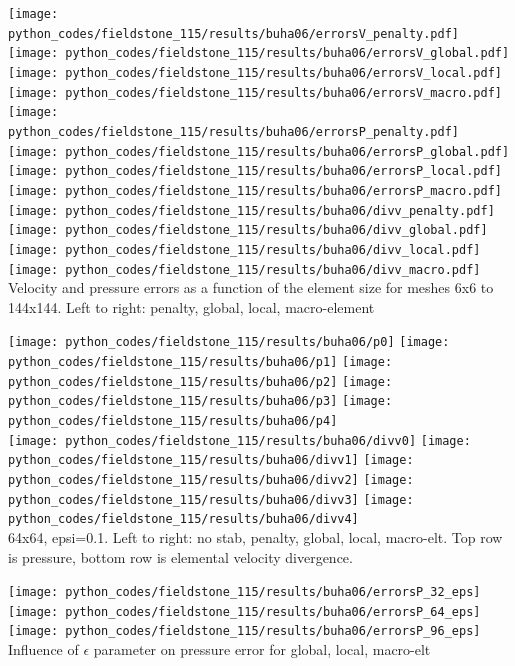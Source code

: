 \begin{center}
\texttt{[image: python\_codes/fieldstone\_115/results/buha06/errorsV\_penalty.pdf]}
\texttt{[image: python\_codes/fieldstone\_115/results/buha06/errorsV\_global.pdf]}
\texttt{[image: python\_codes/fieldstone\_115/results/buha06/errorsV\_local.pdf]}
\texttt{[image: python\_codes/fieldstone\_115/results/buha06/errorsV\_macro.pdf]}\\
\texttt{[image: python\_codes/fieldstone\_115/results/buha06/errorsP\_penalty.pdf]}
\texttt{[image: python\_codes/fieldstone\_115/results/buha06/errorsP\_global.pdf]}
\texttt{[image: python\_codes/fieldstone\_115/results/buha06/errorsP\_local.pdf]}
\texttt{[image: python\_codes/fieldstone\_115/results/buha06/errorsP\_macro.pdf]}\\
\texttt{[image: python\_codes/fieldstone\_115/results/buha06/divv\_penalty.pdf]}
\texttt{[image: python\_codes/fieldstone\_115/results/buha06/divv\_global.pdf]}
\texttt{[image: python\_codes/fieldstone\_115/results/buha06/divv\_local.pdf]}
\texttt{[image: python\_codes/fieldstone\_115/results/buha06/divv\_macro.pdf]}\\
{\captionfont Velocity and pressure errors as a function of the element size for meshes 6x6 to 144x144.
Left to right: penalty, global, local, macro-element}
\end{center}



\begin{center}
\texttt{[image: python\_codes/fieldstone\_115/results/buha06/p0]}
\texttt{[image: python\_codes/fieldstone\_115/results/buha06/p1]}
\texttt{[image: python\_codes/fieldstone\_115/results/buha06/p2]}
\texttt{[image: python\_codes/fieldstone\_115/results/buha06/p3]}
\texttt{[image: python\_codes/fieldstone\_115/results/buha06/p4]}\\
\texttt{[image: python\_codes/fieldstone\_115/results/buha06/divv0]}
\texttt{[image: python\_codes/fieldstone\_115/results/buha06/divv1]}
\texttt{[image: python\_codes/fieldstone\_115/results/buha06/divv2]}
\texttt{[image: python\_codes/fieldstone\_115/results/buha06/divv3]}
\texttt{[image: python\_codes/fieldstone\_115/results/buha06/divv4]}\\
{\captionfont 64x64, epsi=0.1. Left to right: no stab, penalty, global, local, macro-elt.
Top row is pressure, bottom row is elemental velocity divergence.}
\end{center}



\begin{center}
\texttt{[image: python\_codes/fieldstone\_115/results/buha06/errorsP\_32\_eps]}
\texttt{[image: python\_codes/fieldstone\_115/results/buha06/errorsP\_64\_eps]}
\texttt{[image: python\_codes/fieldstone\_115/results/buha06/errorsP\_96\_eps]}\\
{\captionfont Influence of $\epsilon$ parameter on pressure error for global, local, macro-elt}
\end{center}
